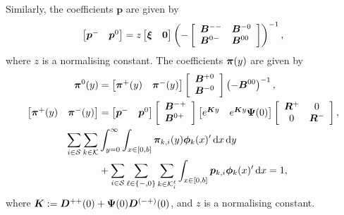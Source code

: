 Similarly, the coefficients \( {\boldsymbol{p}}\) are given by 
	\begin{equation}\begin{bmatrix} \boldsymbol{p}^{-}  & \boldsymbol{p}^{0} \end{bmatrix} = z \begin{bmatrix} {\boldsymbol\xi} & \boldsymbol{0} \end{bmatrix} 
	\left(-\left[\begin{array}{ll} 
		{\boldsymbol B}^{--} & {\boldsymbol B}^{-0} \\
		{\boldsymbol B}^{0-} & {\boldsymbol B}^{00} 
		\end{array} \right] \right)^{-1},\label{eqn:pisystem1}\end{equation}
		where \(z\) is a normalising constant. The coefficients \(\boldsymbol \pi(y)\) are given by 
\begin{align} 
	\;  {\boldsymbol{\pi}}^{0}(y) &= \begin{bmatrix}  {\boldsymbol{\pi}}^{+}(y) &  {\boldsymbol{\pi}}^{-}(y) \end{bmatrix}\left[\begin{array}{l} { {\boldsymbol B}}^{+0} \\ { {\boldsymbol B}}^{-0} \end{array} \right]\left(-{ {\boldsymbol B}}^{00}\right)^{-1}, \\ 
	 \begin{bmatrix}  {\boldsymbol{\pi}}^{+}(y) &  {\boldsymbol{\pi}}^{-}(y) \end{bmatrix}& = \begin{bmatrix}  {\boldsymbol{p}}^{-} &  {\boldsymbol{p}}^{0} \end{bmatrix}\left[\begin{array}{l} { {\boldsymbol B}}^{-+} \\ { {\boldsymbol B}}^{0+} \end{array} \right]\begin{bmatrix} e^{ {\boldsymbol K}y} & e^{ {\boldsymbol K}y}\boldsymbol \Psi(0) \end{bmatrix}\left[\begin{array}{cc}  {\boldsymbol R}^{+} & 0 \\ 0 &  {\boldsymbol R}^{-}\end{array}\right], \\
	 \sum_{i \in \mathcal{S}}\sum_{k \in \mathcal K} & \int_{y = 0}^{\infty} \int_{x \in [0,b]}  \boldsymbol \pi_{k,i}(y)\boldsymbol\phi_k(x)'{}\, \mathrm{d} x\, \mathrm{d} y 
	 \\&{}+  \sum_{i \in \mathcal{S}}\sum_{\ell \in \{-,0\}}\sum_{k\in \mathcal K_i^\ell}  \int_{x \in [0,b]}  \boldsymbol p_{k,i}\boldsymbol\phi_k(x)'{}\, \mathrm{d} x = 1,\label{eqn:pisystem2}
	\end{align}
	where $ {\boldsymbol K} :=  {\boldsymbol D}^{++}(0) + \boldsymbol \Psi(0) {\boldsymbol D}^{(-+)}(0)$, and $z$ is a normalising constant.

